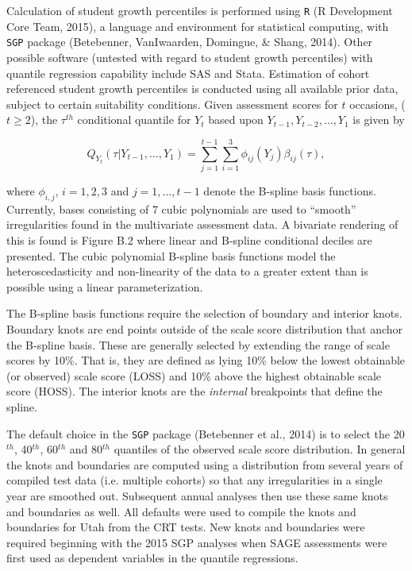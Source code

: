 \documentclass[12pt]{article}
\begin{document}
Calculation of student growth percentiles is performed using \texttt{R}
(R Development Core Team, 2015), a language and environment for
statistical computing, with \texttt{SGP} package (Betebenner,
{VanIwaarden}, Domingue, \& Shang, 2014). Other possible software
(untested with regard to student growth percentiles) with quantile
regression capability include SAS and Stata. Estimation of cohort
referenced student growth percentiles is conducted using all available
prior data, subject to certain suitability conditions. Given assessment
scores for \(t\) occasions, (\(t \geq 2\)), the \(\tau\)\(^{th}\)
conditional quantile for \(Y_ t\) based upon
\(Y_ {t-1}, Y_ {t-2}, \ldots, Y_1\) is given by

\begin{equation} Q_ {Y_ t} (\tau | Y_ {t-1}, \ldots, Y_ 1) = \sum_ {j=1}^{t-1} \sum_ {i=1}^3 \phi_ {ij}(Y_ j)\beta_ {ij}(\tau),\end{equation}

where \(\phi_ {i,j}\), \(i=1,2,3\) and \(j=1, \ldots, t-1\) denote the
B-spline basis functions. Currently, bases consisting of 7 cubic
polynomials are used to ``smooth'' irregularities found in the
multivariate assessment data. A bivariate rendering of this is found is
Figure B.2 where linear and B-spline conditional deciles are presented.
The cubic polynomial B-spline basis functions model the
heteroscedasticity and non-linearity of the data to a greater extent
than is possible using a linear parameterization.

The B-spline basis functions require the selection of boundary and
interior knots. Boundary knots are end points outside of the scale score
distribution that anchor the B-spline basis. These are generally
selected by extending the range of scale scores by 10\%. That is, they
are defined as lying 10\% below the lowest obtainable (or observed)
scale score (LOSS) and 10\% above the highest obtainable scale score
(HOSS). The interior knots are the \emph{internal} breakpoints that
define the spline.

The default choice in the \texttt{SGP} package (Betebenner et al., 2014)
is to select the 20\(^{th}\), 40\(^{th}\), 60\(^{th}\) and 80\(^{th}\)
quantiles of the observed scale score distribution. In general the knots
and boundaries are computed using a distribution from several years of
compiled test data (i.e. multiple cohorts) so that any irregularities in
a single year are smoothed out. Subsequent annual analyses then use
these same knots and boundaries as well. All defaults were used to
compile the knots and boundaries for Utah from the CRT tests. New knots
and boundaries were required beginning with the 2015 SGP analyses when
SAGE assessments were first used as dependent variables in the quantile
regressions.
\end{document}
